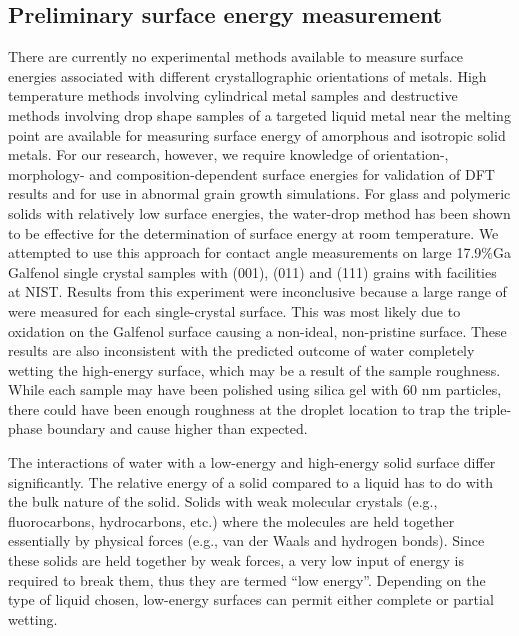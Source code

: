 \subsection{Preliminary surface energy measurement}
There are currently no experimental methods available to measure surface energies associated with different crystallographic orientations of metals. High temperature methods involving cylindrical metal samples and destructive methods involving drop shape samples of a targeted liquid metal near the melting point are available for measuring surface energy of amorphous and isotropic solid metals.\cite{Egry2010,Aqra2011,Cao2011} For our research, however, we require knowledge of orientation-, morphology- and composition-dependent surface energies for validation of DFT results and for use in abnormal grain growth simulations. For glass and polymeric solids with relatively low surface energies, the water-drop method has been shown to be effective for the determination of surface energy at room temperature.\cite{Ahadian2010,Kwok2000,Tavana2005} We attempted to use this approach for contact angle measurements on large 17.9$\%$Ga Galfenol single crystal samples with \hkl(001), \hkl(011) and \hkl(111) grains with facilities at NIST. Results from this experiment were inconclusive because a large range of \ca[s] were measured for each single-crystal surface. This was most likely due to oxidation on the Galfenol surface causing a non-ideal, non-pristine surface. These results are also inconsistent with the predicted outcome of water completely wetting the high-energy surface, which may be a result of the sample roughness. While each sample may have been polished using silica gel with 60 nm particles,\cite{Costa2016} there could have been enough roughness at the droplet location to trap the triple-phase boundary and cause higher \ca[s] than expected. 


The interactions of water with a low-energy and high-energy solid surface differ significantly. The relative energy of a solid compared to a liquid has to do with the bulk nature of the solid. Solids with weak molecular crystals (e.g., fluorocarbons, hydrocarbons, etc.) where the molecules are held together essentially by physical forces (e.g., van der Waals and hydrogen bonds). Since these solids are held together by weak forces, a very low input of energy is required to break them, thus they are termed “low energy”. Depending on the type of liquid chosen, low-energy surfaces can permit either complete or partial wetting. 

